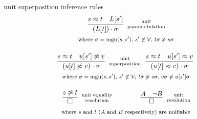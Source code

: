\begin{exampleblock}{unit superposition inference rules}
\begin{gather*}
	\infer
	[\text{unit}\atop\text{paramodulation}]
	{(L[t])\cdot\sigma}
	{s\foEQ t&L[s']}
\\\text{\footnotesize 
where $\sigma=\mgu(s,s')$,
$s'\not\in\mcV$,
$t\sigma\not\succcurlyeq s\sigma$
}\\[1em]
%
	\infer
	[\text{unit}\atop\text{superposition}]
	{(u[t]\foNEQ v)\cdot\sigma}
	{s\foEQ t&u[s']\foNEQ v}
	\hspace{2mm}
	\infer
	[]
	{(u[t]\foEQ v)\cdot\sigma}
	{s\foEQ t&u[s']\foEQ v}
\\\text{\footnotesize 
where $\sigma=\mgu(s,s')$,
$s'\not\in\mathcal{V},$
$t\sigma\not\succcurlyeq s\sigma,$
$v\sigma\not\succcurlyeq u[s']\sigma$
}\\[1em]
%
	\infer
	[\text{unit equality}\atop\text{resolution}]
	{\emptyclause}
	{s\foNEQ t}
	\hspace{4em}
	\infer
	[\text{unit}\atop\text{resolution}]
	{\emptyclause}
	{A&\lnot B}\\
\text{\footnotesize 
where $s$ and $t$ ($A$ and $B$ respectively) are unifiable
}
\end{gather*}

\end{exampleblock}
